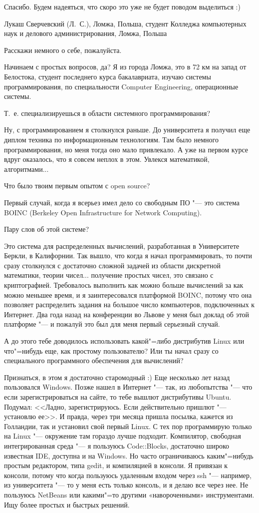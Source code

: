 \documentclass[10pt, a5paper]{article}
\begin{document}
\q Спасибо. Будем надеяться, что скоро это уже не будет поводом выделиться :)

\interview Лукаш Сверчевский (Л.~С.), Ломжа, Польша, студент Колледжа компьютерных наук и делового администрирования, Ломжа, Польша

\q Расскажи немного о себе, пожалуйста.

\a Начинаем с простых вопросов, да? Я из города Ломжа, это в 72 км на запад от Белостока, студент последнего курса бакалавриата, изучаю системы программирования,  по специальности Computer Engineering, операционные системы. 

\q Т.~е. специализируешься в области системного программирования?

\a Ну, с программированием я столкнулся раньше. До университета я получил еще диплом техника по информационным технологиям. Там было немного программирования, но меня тогда оно мало привлекало. А уже на первом курсе вдруг оказалось, что я совсем неплох в этом. Увлекся математикой, алгоритмами... 

\q Что было твоим первым опытом с open source?

\a Первый случай, когда я всерьез имел дело со свободным ПО "--- это система BOINC (Berkeley Open Infrastructure for Network Computing). 

\q Пару слов об этой системе?

\a Это система для распределенных вычислений, разработанная в Университете Беркли, в Калифорнии. Так вышло, что когда я начал программировать, то почти сразу столкнулся с достаточно сложной задачей из области дискретной математики, теории чисел... получение простых чисел, это связано с криптографией. Требовалось выполнить как можно больше вычислений за как можно меньшее время, и я заинтересовался платформой BOINC, потому что она позволяет распределить задания на большое число компьютеров, подключенных к Интернет. Два года назад на конференции во Львове у меня был доклад об этой платформе "--- и пожалуй это был для меня первый серьезный случай.

\q А до этого тебе доводилось использовать какой"=либо дистрибутив Linux или что"=нибудь еще, как простому пользователю? Или ты начал сразу со специального программного обеспечения для вычислений?

\a Признаться, в этом я достаточно старомодный :) Еще несколько лет назад пользовался Windows. Позже нашел в Интернет "--- так, из любопытства "--- что если зарегистрироваться на сайте, то тебе вышлют дистрибутивы Ubuntu. Подумал: <<Ладно, зарегистрируюсь. Если действительно пришлют "--- установлю ее>>. И правда, через три месяца пришла посылка, кажется из Голландии, так и установил свой первый Linux. С тех пор программирую только на Linux "--- окружение там гораздо лучше подходит. Компилятор, свободная интегрированная среда "--- я пользуюсь Code::Blocks, достаточно широко известная IDE, доступна и на Windows. Но часто ограничиваюсь каким"=нибудь простым редактором, типа gedit, и компиляцией в консоли. Я привязан к консоли, потому что когда пользуюсь удаленным входом через ssh "--- например, из университета "--- то у меня есть только консоль, и я делаю все через нее. Не пользуюсь NetBeans или какими"=то другими «навороченными» инструментами. Ищу более простых и быстрых решений.
\end{document}
